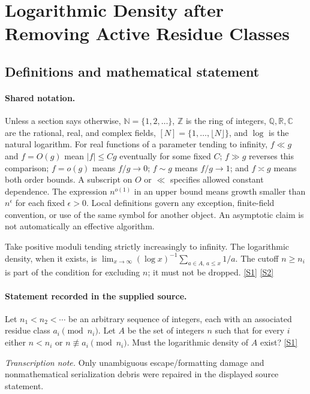 \documentclass[11pt,a4paper]{article}
\newcommand{\N}{\mathbb{N}}
\newcommand{\Z}{\mathbb{Z}}
\newcommand{\Q}{\mathbb{Q}}
\newcommand{\R}{\mathbb{R}}
\newcommand{\C}{\mathbb{C}}
\newcommand{\sref}[2]{\hyperlink{source:#1:#2}{[S#2]}}
\begin{document}
\section{Logarithmic Density after Removing Active Residue Classes}\label{statement}


\subsection{Definitions and mathematical statement}

\paragraph{Shared notation.}Unless a section says otherwise, $\N=\{1,2,\ldots\}$,
$\Z$ is the ring of integers, $\Q,\R,\C$ are the rational, real, and complex
fields, $[N]=\{1,\ldots,\lfloor N\rfloor\}$, and $\log$ is the natural
logarithm. For real functions of a parameter tending to infinity,
$f\ll g$ and $f=O(g)$ mean $|f|\leq Cg$ eventually for some fixed $C$;
$f\gg g$ reverses this comparison; $f=o(g)$ means $f/g\to0$;
$f\sim g$ means $f/g\to1$; and $f\asymp g$ means both order bounds.
A subscript on $O$ or $\ll$ specifies allowed constant dependence.
The expression $n^{o(1)}$ in an upper bound means growth smaller than
$n^\epsilon$ for each fixed $\epsilon>0$. Local definitions govern any
exception, finite-field convention, or use of the same symbol for another
object. An asymptotic claim is not automatically an effective algorithm.



Take positive moduli tending strictly increasingly to infinity. The logarithmic density, when it exists, is $\lim_{x\to\infty}(\log x)^{-1}\sum_{a\in A,\,a\leq x}1/a$. The cutoff $n\geq n_i$ is part of the condition for excluding $n$; it must not be dropped. \sref{statement}{1} \sref{statement}{2}

\paragraph{Statement recorded in the supplied source.}
Let $n_1<n_2<\cdots$ be an arbitrary sequence of integers, each with an associated residue class $a_i\pmod{n_i}$. Let $A$ be the set of integers $n$ such that for every $i$ either $n<n_i$ or $n\not\equiv a_i\pmod{n_i}$. Must the logarithmic density of $A$ exist? \sref{statement}{1}

{\small\emph{Transcription note.} Only unambiguous escape/formatting damage and nonmathematical serialization debris were repaired in the displayed source statement.}
\end{document}
